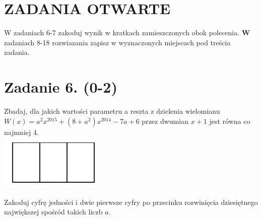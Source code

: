 \documentclass[10pt]{article}
\begin{document}
\section*{ZADANIA OTWARTE}
W zadaniach 6-7 zakoduj wynik w kratkach zamieszczonych obok polecenia. \(\mathbf{W}\) zadaniach 8-18 rozwiazania zapisz w wyznaczonych miejscach pod treścia zadania.

\section*{Zadanie 6. (0-2)}
Zbadaj, dla jakich wartości parametru a reszta z dzielenia wielomianu\\
\(W(x)=a^{2} x^{2015}+\left(8+a^{2}\right) x^{2014}-7 a+6\) przez dwumian \(x+1\) jest równa co najmniej 4.\\
\includegraphics[max width=\textwidth, center]{2024_11_21_8206013b40ecc9b11a30g-04}

Zakoduj cyfrę jedności i dwie pierwsze cyfry po przecinku rozwinięcia dziesiętnego największej spośród takich liczb \(a\).
\end{document}
